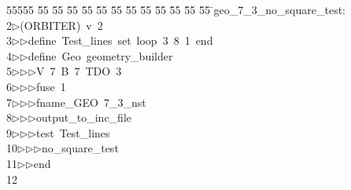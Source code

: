 %
%
\begin{tabbing}
55555 \= 55 \= 55 \= 55 \= 55 \= 55 \= 55 \= 55 \= 55 \= 55 \= 55 \= 55 \= 55 \= \>geo\_7\_3\_no\_square\_test:\\[0pt]
2\>$\triangleright$\>(ORBITER)\ v\ 2\ \\[0pt]
3\>$\triangleright$\>$\triangleright$\>define\ Test\_lines\ set\ loop\ 3\ 8\ 1\ end\ \\[0pt]
4\>$\triangleright$\>$\triangleright$\>define\ Geo\ geometry\_builder\ \\[0pt]
5\>$\triangleright$\>$\triangleright$\>$\triangleright$\>V\ 7\ B\ 7\ TDO\ 3\ \\[0pt]
6\>$\triangleright$\>$\triangleright$\>$\triangleright$\>fuse\ 1\ \\[0pt]
7\>$\triangleright$\>$\triangleright$\>$\triangleright$\>fname\_GEO\ 7\_3\_nst\ \\[0pt]
8\>$\triangleright$\>$\triangleright$\>$\triangleright$\>output\_to\_inc\_file\ \\[0pt]
9\>$\triangleright$\>$\triangleright$\>$\triangleright$\>test\ Test\_lines\ \\[0pt]
10\>$\triangleright$\>$\triangleright$\>$\triangleright$\>no\_square\_test\ \\[0pt]
11\>$\triangleright$\>$\triangleright$\>end\\[0pt]
12\>\end{tabbing}
